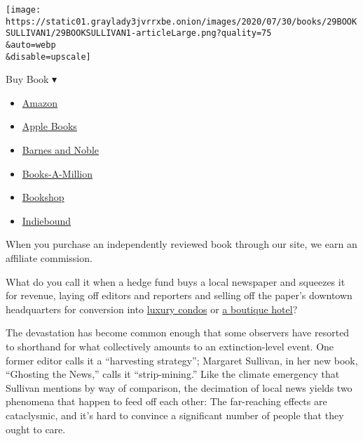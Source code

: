 \texttt{[image: https://static01.graylady3jvrrxbe.onion/images/2020/07/30/books/29BOOKSULLIVAN1/29BOOKSULLIVAN1-articleLarge.png?quality=75\\\&auto=webp\\\&disable=upscale]}

Buy Book ▾

\begin{itemize}
\tightlist
\item
  \href{https://www.amazon.com/gp/search?index=books\&tag=NYTBSREV-20\&field-keywords=Ghosting+the+News+Margaret+Sullivan}{Amazon}
\item
  \href{https://du-gae-books-dot-nyt-du-prd.appspot.com/buy?title=Ghosting+the+News\&author=Margaret+Sullivan}{Apple
  Books}
\item
  \href{https://www.anrdoezrs.net/click-7990613-11819508?url=https\%3A\%2F\%2Fwww.barnesandnoble.com\%2Fw\%2F\%3Fean\%3D9781733623780}{Barnes
  and Noble}
\item
  \href{https://www.anrdoezrs.net/click-7990613-35140?url=https\%3A\%2F\%2Fwww.booksamillion.com\%2Fp\%2FGhosting\%2Bthe\%2BNews\%2FMargaret\%2BSullivan\%2F9781733623780}{Books-A-Million}
\item
  \href{https://bookshop.org/a/3546/9781733623780}{Bookshop}
\item
  \href{https://www.indiebound.org/book/9781733623780?aff=NYT}{Indiebound}
\end{itemize}

When you purchase an independently reviewed book through our site, we
earn an affiliate commission.

What do you call it when a hedge fund buys a local newspaper and
squeezes it for revenue, laying off editors and reporters and selling
off the paper's downtown headquarters for conversion into
\href{https://www.nytimes3xbfgragh.onion/2020/02/11/business/newspaper-building-redevelopment.html}{luxury
condos} or
\href{https://www.nytimes3xbfgragh.onion/2020/07/10/us/alden-global-capital-pottstown-mercury.html}{a
boutique hotel}?

The devastation has become common enough that some observers have
resorted to shorthand for what collectively amounts to an
extinction-level event. One former editor calls it a ``harvesting
strategy''; Margaret Sullivan, in her new book, ``Ghosting the News,''
calls it ``strip-mining.'' Like the climate emergency that Sullivan
mentions by way of comparison, the decimation of local news yields two
phenomena that happen to feed off each other: The far-reaching effects
are cataclysmic, and it's hard to convince a significant number of
people that they ought to care.

